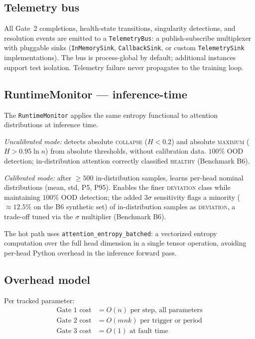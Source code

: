 \documentclass[11pt,a4paper]{article}
\theoremstyle{plain}
\begin{document}
\subsection{Telemetry bus}
\label{sec:telemetry}

All Gate~2 completions, health-state transitions, singularity
detections, and resolution events are emitted to a \texttt{TelemetryBus}:
a publish-subscribe multiplexer with pluggable sinks
(\texttt{InMemorySink}, \texttt{CallbackSink}, or custom
\texttt{TelemetrySink} implementations).
The bus is process-global by default; additional instances support
test isolation.
Telemetry failure never propagates to the training loop.

\subsection{RuntimeMonitor --- inference-time}
\label{sec:runtime}

The \texttt{RuntimeMonitor} applies the same entropy functional to
attention distributions at inference time.

\textit{Uncalibrated mode:} detects absolute \textsc{collapse}
($H < 0.2$) and absolute \textsc{maximum} ($H > 0.95 \ln n$)
from absolute thresholds, without calibration data.
$100\%$ OOD detection; in-distribution attention correctly classified
\textsc{healthy} (Benchmark B6).

\textit{Calibrated mode:} after $\geq 500$ in-distribution samples,
learns per-head nominal distributions (mean, std, P5, P95).
Enables the finer \textsc{deviation} class while maintaining $100\%$
OOD detection; the added $3\sigma$ sensitivity flags a minority
($\approx 12.5\%$ on the B6 synthetic set) of in-distribution samples
as \textsc{deviation}, a trade-off tuned via the $\sigma$ multiplier
(Benchmark B6).

The hot path uses \texttt{attention\_entropy\_batched}: a vectorized
entropy computation over the full head dimension in a single tensor
operation, avoiding per-head Python overhead in the inference forward
pass.

\subsection{Overhead model}
\label{sec:overhead_model}

Per tracked parameter:
\begin{align*}
\text{Gate~1 cost} &= O(n) \text{ per step, all parameters} \\
\text{Gate~2 cost} &= O(mnk) \text{ per trigger or period} \\
\text{Gate~3 cost} &= O(1) \text{ at fault time}
\end{align*}
\end{document}
